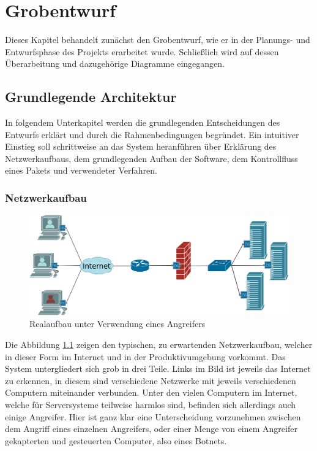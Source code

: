 \documentclass[../review_2.tex]{subfiles}
\begin{document}
\chapter{Grobentwurf}\thispagestyle{fancy}


Dieses Kapitel behandelt zunächst den Grobentwurf, wie er in der Planungs- und Entwurfsphase des Projekts erarbeitet wurde. Schließlich wird auf dessen Überarbeitung und dazugehörige Diagramme eingegangen. 

\section{Grundlegende Architektur}

In folgendem Unterkapitel werden die grundlegenden Entscheidungen des Entwurfs erklärt und durch die Rahmenbedingungen begründet. Ein intuitiver Einstieg soll schrittweise an das System heranführen über Erklärung des Netzwerkaufbaus, dem grundlegenden Aufbau der Software, dem Kontrollfluss eines Pakets und verwendeter Verfahren.

\subsection{Netzwerkaufbau}
\begin{figure}[h]
    \centering
    \includegraphics[width=1.0\linewidth]{img/Netzwerkplan-Real}
    \caption{Realaufbau unter Verwendung eines Angreifers}
    \label{fig:netzwerkplan-real}
\end{figure}
Die Abbildung \ref{fig:netzwerkplan-real} zeigen den typischen, zu erwartenden Netzwerkaufbau, welcher in dieser Form im Internet und in der Produktivumgebung vorkommt. Das System untergliedert sich grob in drei Teile. Links im Bild ist jeweils das Internet zu erkennen, in diesem sind verschiedene Netzwerke mit jeweils verschiedenen Computern miteinander verbunden. Unter den vielen Computern im Internet, welche für Serversysteme teilweise harmlos sind, befinden sich allerdings auch einige Angreifer. Hier ist ganz klar eine Unterscheidung vorzunehmen zwischen dem Angriff eines einzelnen Angreifers, oder einer Menge von einem Angreifer gekapterten und gesteuerten Computer, also eines Botnets. 
\end{document}

